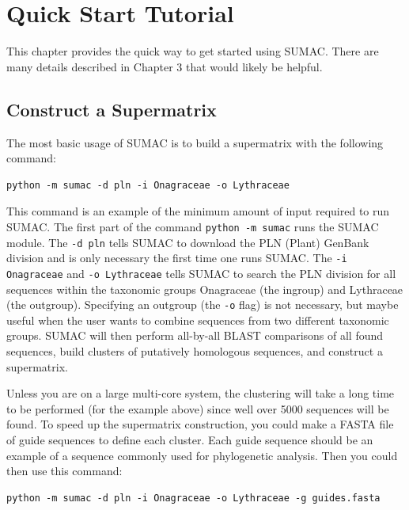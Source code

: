 \documentclass[10pt]{report}
\begin{document}

\chapter{Quick Start Tutorial}

This chapter provides the quick way to get started using SUMAC. 
There are many details described in Chapter 3 that
would likely be helpful.

\section{Construct a Supermatrix}

The most basic usage of SUMAC is to build a supermatrix with the following
command:

\begin{verbatim}
python -m sumac -d pln -i Onagraceae -o Lythraceae
\end{verbatim}

This command is an example of the minimum amount of input required
to run SUMAC. The first part of the command \texttt{python -m sumac}
runs the SUMAC module. The \texttt{-d pln}
tells SUMAC to download the PLN (Plant) GenBank division and is only necessary the first time one runs SUMAC. The
\texttt{-i Onagraceae} and \texttt{-o Lythraceae}
tells SUMAC to search the PLN division for all sequences within
the taxonomic groups Onagraceae (the ingroup) and Lythraceae (the outgroup).
Specifying an outgroup (the \texttt{-o} flag) is not necessary, 
but maybe useful when the user wants to combine sequences from two
different taxonomic groups.
SUMAC will then perform all-by-all BLAST comparisons of all found sequences, 
build clusters of putatively homologous sequences, and 
construct a supermatrix. 

Unless you are on a large multi-core system, the clustering
will take a long time to be performed (for the example above) 
since well over 5000 sequences will be found.
To speed up the supermatrix construction, you could make a FASTA file
of guide sequences to define each cluster. Each guide
sequence should be an example of a sequence commonly used for phylogenetic
analysis. Then you could then use this command:

\begin{verbatim}
python -m sumac -d pln -i Onagraceae -o Lythraceae -g guides.fasta
\end{verbatim}
\end{document}
